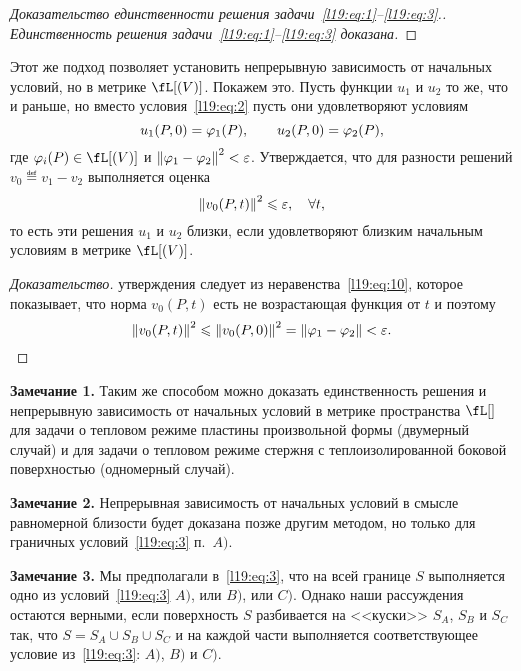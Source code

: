 \begin{proof}[Доказательство единственности решения задачи~\eqref{l19:eq:1}--\eqref{l19:eq:3}.]
	\noindent \emph{Единственность решения задачи~\eqref{l19:eq:1}--\eqref{l19:eq:3} доказана.}
\end{proof}
Этот же подход позволяет установить непрерывную зависимость от начальных условий, но в метрике $\fL[(V)]$. Покажем это.
Пусть функции $u_1$ и $u_2$ то же, что и раньше, но вместо условия~\eqref{l19:eq:2} пусть они удовлетворяют условиям 
\begin{equation*}
	\hfill u_1(P,0)=\phi_1(P),\qquad u_2(P,0)=\phi_2(P),
\end{equation*}
где $\phi_i(P)\in\fL[(V)]$ и $\left\|\varphi_1-\varphi_2\right\|^2<\varepsilon$. Утверждается, что для разности решений $v_0\eqdef v_1-v_2$ выполняется оценка 
\begin{equation*}
	\hfill\norm{v_0(P,t)}^2\leqslant\eps,\quad\forall t,\hfill
\end{equation*}
то есть эти решения $u_1$ и $u_2$ близки, если удовлетворяют близким начальным условиям в метрике $\fL[(V)]$.
\begin{proof}[Доказательство]
	утверждения следует из неравенства~\eqref{l19:eq:10}, которое показывает, что норма $v_0(P,t)$ есть не возрастающая функция от $t$ и поэтому 
	\begin{equation*}
		\hfill \norm{v_0(P,t)}^2\leqslant\norm{v_0(P,0)}^2=\norm{\phi_1-\phi_2}<\eps.\hfill
	\end{equation*}
\end{proof}

\noindent\textbf{Замечание 1. }Таким же способом можно доказать единственность решения и непрерывную зависимость от начальных условий в метрике пространства $\fL[]$ для задачи о тепловом режиме пластины произвольной формы (двумерный случай) и для задачи о тепловом режиме стержня с теплоизолированной боковой поверхностью (одномерный случай).

\noindent\textbf{Замечание 2. }Непрерывная зависимость от начальных условий в смысле равномерной близости будет доказана позже другим методом, но только для граничных условий~\eqref{l19:eq:3} п.~$A)$.

\noindent\textbf{Замечание 3. }Мы предполагали в~\eqref{l19:eq:3}, что на всей границе $S$ выполняется одно из условий~\eqref{l19:eq:3} $A)$, или $B)$, или $C)$. Однако наши рассуждения остаются верными, если поверхность $S$ разбивается на <<куски>> $S_A$, $S_B$ и $S_C$ так, что $S=S_A\cup S_B\cup S_C$ и на каждой части выполняется соответствующее условие из~\eqref{l19:eq:3}: $A)$, $B)$ и $C)$.

\newpage

